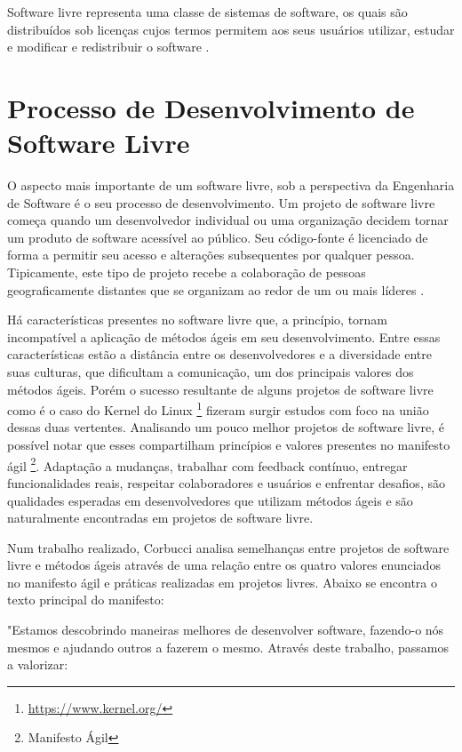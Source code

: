 Software livre representa uma classe de sistemas de software, os quais são distribuídos sob licenças cujos termos permitem aos seus usuários utilizar, estudar e modificar e redistribuir o software \cite{terceiro2012freesoftware}. 

\section{Processo de Desenvolvimento de Software Livre}

O aspecto mais importante de um software livre, sob a perspectiva da Engenharia de Software é o seu processo de desenvolvimento. Um projeto de software livre começa quando um desenvolvedor individual ou uma organização decidem tornar um produto de software acessível ao público. Seu código-fonte é licenciado de forma a permitir seu acesso e alterações subsequentes por qualquer pessoa. Tipicamente, este tipo de projeto recebe a colaboração de pessoas geograficamente distantes que se organizam ao redor de um ou mais líderes \cite{corbucci2011freemethods}. 

Há características presentes no software livre que, a princípio, tornam incompatível a aplicação de métodos ágeis em seu desenvolvimento. Entre essas características estão a distância entre os desenvolvedores e a diversidade entre suas culturas, que dificultam a comunicação, um dos principais valores dos métodos ágeis. Porém o sucesso resultante de alguns projetos de software livre como é o caso do Kernel do Linux \footnote{\url{https://www.kernel.org/}} fizeram surgir estudos com foco na união dessas duas vertentes. Analisando um pouco melhor projetos de software livre, é possível notar que esses compartilham princípios e valores presentes no manifesto ágil \footnote{Manifesto Ágil}. Adaptação a mudanças, trabalhar com feedback contínuo, entregar funcionalidades reais, respeitar colaboradores e usuários e enfrentar desafios, são qualidades esperadas em desenvolvedores que utilizam métodos ágeis e são naturalmente encontradas em projetos de software livre.

Num trabalho realizado, Corbucci \cite{corbucci2011freemethods} analisa semelhanças entre projetos de software livre e métodos ágeis através de uma relação entre os quatro valores enunciados no manifesto ágil e práticas realizadas em projetos livres. Abaixo se encontra o texto principal do manifesto:

"Estamos descobrindo maneiras melhores de desenvolver software, fazendo-o nós mesmos
e ajudando outros a fazerem o mesmo. Através deste trabalho, passamos a valorizar:

